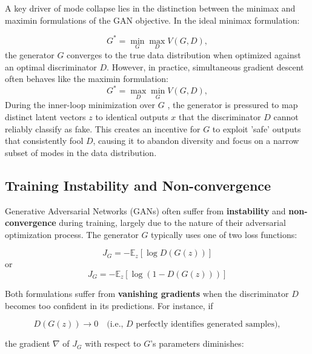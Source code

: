 A key driver of mode collapse lies in the distinction between the minimax and maximin formulations of the GAN objective. In the ideal minimax formulation:

\begin{equation}
    G^* = \min_G \max_D V(G, D),
\end{equation}
the generator \(G\) converges to the true data distribution when optimized against an optimal discriminator \(D\). However, in practice, simultaneous gradient descent often behaves like the maximin formulation:
\begin{equation}
    G^* = \max_D \min_G V(G, D),
\end{equation}
During the inner-loop minimization over \(G\) , the generator is pressured to map distinct latent vectors \(z\) to identical outputs \(x\) that the discriminator \(D\) cannot reliably classify as fake. This creates an incentive for \(G\) to exploit 'safe' outputs that consistently fool \(D\), causing it to abandon diversity and focus on a narrow subset of modes in the data distribution.

\subsection{Training Instability and Non-convergence}

Generative Adversarial Networks (GANs) often suffer from \textbf{instability} and \textbf{non-convergence} during training, largely due to the nature of their adversarial optimization process. \cite{salimans2016improved, arjovsky2017principled} The generator \( G \) typically uses one of two loss functions:  

\begin{equation}
    J_G = - \mathbb{E}_{z} [\log D(G(z))]
\end{equation}
or
\begin{equation}
J_G = - \mathbb{E}_{z} [\log(1 - D(G(z)))]
\end{equation}

Both formulations suffer from \textbf{vanishing gradients} when the discriminator \(D\) becomes too confident in its predictions. For instance, if 

\begin{equation}
D(G(z)) \to 0 \quad \text{(i.e., \(D\) perfectly identifies generated samples)},
\end{equation}

the gradient $\nabla$ of \(J_G\) with respect to \(G\)'s parameters diminishes:

